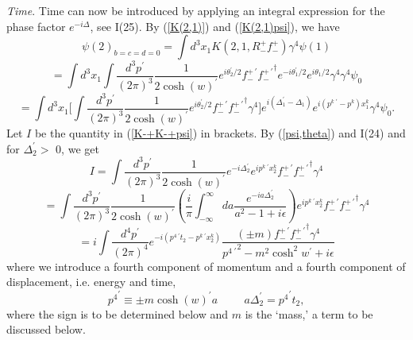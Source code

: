 \documentclass[a4paper,12pt]{article}
\begin{document}
	{\textit{Time}}. Time can now be introduced by applying an integral expression for the phase factor $e^{-i\Delta}$, see I(25). 	By (\ref{K(2,1)}) and (\ref{K(2,1)psi}), we have
	$$\psi(2)_{b=c=d=0} = \int d^3x_{1}K(2,1,R_{-}^{+}f_{-}^{+}) \gamma^{4} \psi(1) $$ $$ =  \int d^3x_{1}\int \frac{d^3 p^{\prime} }{(2 \pi)^3} \frac{1}{2 {\cosh{(w)}}^{\prime}}e^{i \theta_{2}^{\prime}/2}  f_{-}^{+ \, \prime} {f_{-}^{+ \, \prime }}^{\dagger} e^{ -i \theta_{1}^{\prime}/2}e^{i \theta_{1} / 2} \gamma^{4} \gamma^{4} \psi_{0}
$$
\begin{equation}	\label{K-+K-+psi}
= \int d^3 x_{1}\lbrack \int \frac{d^3 p^{\prime} }{(2 \pi)^3} \frac{1}{2 {\cosh{(w)}}^{\prime}}e^{i \theta_{2}^{\prime}/2}  f_{-}^{+ \, \prime} {f_{-}^{+ \, \prime }}^{\dagger} \gamma^{4}\rbrack e^{ i (\Delta_{1}^{\prime}- \Delta_{1})} e^{i (p^{k \; \prime} - p^{k})x_{1}^{k}}  \gamma^{4} \psi_{0}.
\end{equation}
Let $I$ be the quantity in (\ref{K-+K-+psi}) in brackets. By (\ref{psi,theta}) and I(24) and for $\Delta_{2}^{\prime} >$ 0, we get
$$ I = \int \frac{d^3 p^{\prime} }{(2 \pi)^3} \frac{1}{2 {\cosh{(w)}}^{\prime}} e^{-i\Delta_{2}^{\prime}} e^{ip^{k \; \prime}x_{2}^{k}} f_{-}^{+ \, \prime} {f_{-}^{+ \, \prime }}^{\dagger} \gamma^{4} 
$$
$$= \int \frac{d^3 p^{\prime} }{(2 \pi)^3} \frac{1}{2 {\cosh{(w)}}^{\prime}}  ( \frac{i}{ \pi}  \int_{-\infty}^{\infty} da \frac{e^{-ia\Delta_{2}^{\prime}}}{a^2-1+i\epsilon}) e^{ip^{k \; \prime}x_{2}^{k}} f_{-}^{+ \, \prime} {f_{-}^{+ \, \prime }}^{\dagger} \gamma^{4} 
$$
\begin{equation} \label{QED}
=  i  \int \frac{d^4 p^{\prime} }{(2 \pi)^4} e^{-i(p^{4 \; \prime}t_{2} - p^{k \; \prime}x_{2}^{k})}  \frac{ (\pm m) f_{-}^{+ \, \prime} {f_{-}^{+ \, \prime }}^{\dagger} \gamma^{4}}{{p^{4 \; \prime}}^2- m^{2} \cosh^{2}{w}^{\prime} + i\epsilon} 
\end{equation}
where we introduce a fourth component of momentum and a fourth component of displacement, i.e. energy and time,
\begin{equation}	\label{p4t}
{p^{4}}^{\prime} \equiv \pm m {\cosh{(w)}}^{\prime} a   \hspace{1cm}  a \Delta_{2}^{\prime} = {p^{4}}^{\prime} t_{2} , 
\end{equation}
where the sign is to be determined below and $m$ is the `mass,' a term to be discussed below.
\end{document}
